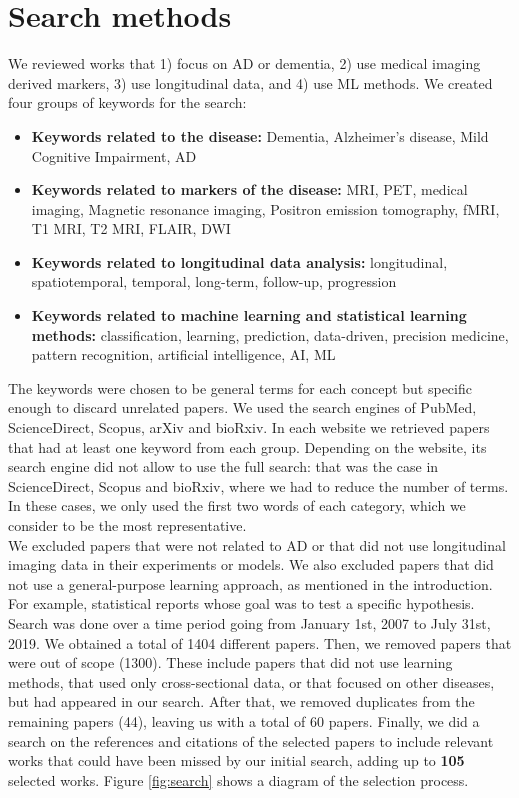 \section{Search methods}
\label{sec:search}

We reviewed works that 1) focus on AD or dementia, 2) use medical imaging derived markers, 3) use longitudinal data, and 4) use ML methods. We created four groups of keywords for the search:

\begin{itemize}\itemsep5pt
  \item \textbf{Keywords related to the disease:} Dementia, Alzheimer’s disease, Mild Cognitive Impairment, AD
  \item \textbf{Keywords related to markers of the disease:} MRI, PET, medical imaging, Magnetic resonance imaging, Positron emission tomography, fMRI, T1 MRI, T2 MRI, FLAIR, DWI
  \item \textbf{Keywords related to longitudinal data analysis:} longitudinal, spatiotemporal, temporal, long-term, follow-up, progression
  \item \textbf{Keywords related to machine learning and statistical learning methods:} classification, learning, prediction, data-driven, precision medicine, pattern recognition, artificial intelligence, AI, ML
\end{itemize}

The keywords were chosen to be general terms for each concept but specific enough to discard unrelated papers. We used the search engines of PubMed, ScienceDirect, Scopus, arXiv and bioRxiv. In each website we retrieved papers that had at least one keyword from each group. Depending on the website, its search engine did not allow to use the full search: that was the case in ScienceDirect, Scopus and bioRxiv, where we had to reduce the number of terms. In these cases, we only used the first two words of each category, which we consider to be the most representative. \\

We excluded papers that were not related to AD or that did not use longitudinal imaging data in their experiments or models. We also excluded papers that did not use a general-purpose learning approach, as mentioned in the introduction. For example, statistical reports whose goal was to test a specific hypothesis. \\

Search was done over a time period going from January 1st, 2007 to July 31st, 2019. We obtained a total of 1404 different papers. Then, we removed papers that were out of scope (1300). These include papers that did not use learning methods, that used only cross-sectional data, or that focused on other diseases, but had appeared in our search. After that, we removed duplicates from the remaining papers (44), leaving us with a total of 60 papers. Finally, we did a search on the references and citations of the selected papers to include relevant works that could have been missed by our initial search, adding up to \textbf{105} selected works. Figure \ref{fig:search} shows a diagram of the selection process.

